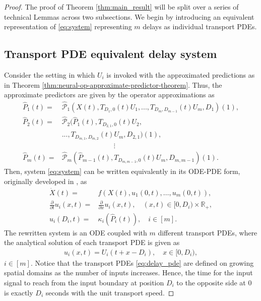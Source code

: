 \documentclass[letterpaper, 10 pt, conference]{ieeeconf}  %
\begin{document}
\begin{proof}
    The proof of Theorem \ref{thm:main_result} will be split over a series of technical Lemmas across two subsections. We begin by introducing an equivalent representation of \eqref{eq:system} representing $m$ delays as individual transport PDEs.
\subsection{Transport PDE equivalent delay system}
Consider the setting in which $U_i$ is invoked with the approximated predictions as in Theorem \ref{thm:neural-op-approximate-predictor-theorem}. Thus, the approximate predictors are given by the operator approximations as 
\begin{subequations}
\begin{align}
    \hat{P}_1(t) =& \hat{\mathcal{P}}_1(X(t), T_{D_1,0}(t)U_1, ..., T_{D_m,D_{m-1}}(t)U_m, D_1)(1), \\
    \hat{P}_2(t) =& \hat{\mathcal{P}}_2(\hat{P}_1(t), T_{D_{2,1},0}(t)U_2, \nonumber \\ &..., T_{D_{m,1},D_{m,2}}(t)U_m, D_{2,1})(1), \\
    &\ \hspace{3cm} \vdots \nonumber \\
    \hat{P}_m(t) =& \hat{\mathcal{P}}_m(\hat{P}_{m-1}(t), T_{D_{m,m-1},0}(t)U_m, D_{m,m-1})(1).
\end{align}
\end{subequations}
Then,  system \eqref{eq:system} can be written equivalently in its ODE-PDE form, originally developed in \cite{Krstic:2010}, as
\begin{subequations}\label{eqs:plant_ode_pde}
    \begin{align}
        \dot{X}(t) =& f(X(t), u_1(0,t), \ldots, u_m(0,t)), \label{eq:state} \\
        \frac{\partial}{\partial t} u_i(x,t) =& \frac{\partial}{\partial x} u_i(x,t), \quad (x,t) \in [0,D_i) \times \mathbb{R}_+,\label{eq:delay_pde} \\
        u_i(D_i,t) =&\kappa_i(\hat{P}_i(t)), \quad i \in [m]. \label{eq:pde_boundary}
    \end{align}
\end{subequations}
The rewritten system is an ODE coupled with $m$ different transport PDEs, where the analytical solution of each transport PDE is given as
\begin{align}
    u_i(x,t) = U_i(t+x-D_i), \quad x \in [0, D_i),
\end{align}
$i \in [m]$. Notice that the transport PDEs \eqref{eq:delay_pde} are defined on growing spatial domains as the number of inputs increases. Hence, the time for the input signal to reach from the input boundary at position $D_i$ to the opposite side at $0$ is exactly $D_i$ seconds with the unit transport speed. 







\end{proof}
\end{document}
